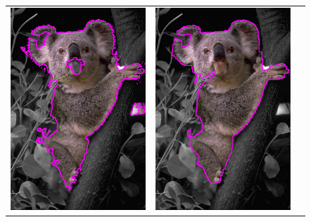 \documentclass[runningheads]{llncs}
\begin{document}
\begin{figure}
\begin{tabular}{ccc}
 	\includegraphics[scale=0.25]{images/segmentation/coala/lg0_sq0_dt1_it20.png} & 
	\includegraphics[scale=0.25]{images/segmentation/coala/r3/lg1_sq0_dt1_it50.png} &

\end{tabular}
\end{figure}
\end{document}
